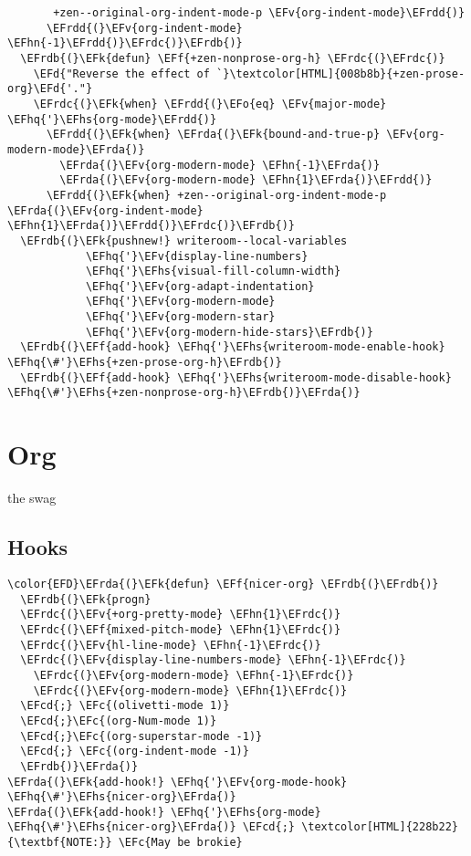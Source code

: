 \documentclass{article}
\newcommand{\EFc}[1]{\textcolor{EFc}{#1}} %
\newcommand{\EFcd}[1]{\textcolor{EFcd}{#1}} %
\newcommand{\EFd}[1]{\textcolor{EFd}{#1}} %
\newcommand{\EFk}[1]{\textcolor{EFk}{#1}} %
\newcommand{\EFf}[1]{\textcolor{EFf}{#1}} %
\newcommand{\EFv}[1]{\textcolor{EFv}{#1}} %
\newcommand{\EFo}[1]{\textcolor{EFo}{#1}} %
\newcommand{\EFhn}[1]{\textcolor{EFhn}{\textbf{#1}}} %
\newcommand{\EFhq}[1]{#1} %
\newcommand{\EFhs}[1]{\textcolor{EFhs}{#1}} %
\newcommand{\EFrda}[1]{\textcolor{EFrda}{#1}} %
\newcommand{\EFrdb}[1]{\textcolor{EFrdb}{#1}} %
\newcommand{\EFrdc}[1]{\textcolor{EFrdc}{#1}} %
\newcommand{\EFrdd}[1]{\textcolor{EFrdd}{#1}} %
\begin{document}
\begin{Code}
\begin{Verbatim}
       +zen--original-org-indent-mode-p \EFv{org-indent-mode}\EFrdd{)}
      \EFrdd{(}\EFv{org-indent-mode} \EFhn{-1}\EFrdd{)}\EFrdc{)}\EFrdb{)}
  \EFrdb{(}\EFk{defun} \EFf{+zen-nonprose-org-h} \EFrdc{(}\EFrdc{)}
    \EFd{"Reverse the effect of `}\textcolor[HTML]{008b8b}{+zen-prose-org}\EFd{'."}
    \EFrdc{(}\EFk{when} \EFrdd{(}\EFo{eq} \EFv{major-mode} \EFhq{'}\EFhs{org-mode}\EFrdd{)}
      \EFrdd{(}\EFk{when} \EFrda{(}\EFk{bound-and-true-p} \EFv{org-modern-mode}\EFrda{)}
        \EFrda{(}\EFv{org-modern-mode} \EFhn{-1}\EFrda{)}
        \EFrda{(}\EFv{org-modern-mode} \EFhn{1}\EFrda{)}\EFrdd{)}
      \EFrdd{(}\EFk{when} +zen--original-org-indent-mode-p \EFrda{(}\EFv{org-indent-mode} \EFhn{1}\EFrda{)}\EFrdd{)}\EFrdc{)}\EFrdb{)}
  \EFrdb{(}\EFk{pushnew!} writeroom--local-variables
            \EFhq{'}\EFv{display-line-numbers}
            \EFhq{'}\EFhs{visual-fill-column-width}
            \EFhq{'}\EFv{org-adapt-indentation}
            \EFhq{'}\EFv{org-modern-mode}
            \EFhq{'}\EFv{org-modern-star}
            \EFhq{'}\EFv{org-modern-hide-stars}\EFrdb{)}
  \EFrdb{(}\EFf{add-hook} \EFhq{'}\EFhs{writeroom-mode-enable-hook} \EFhq{\#'}\EFhs{+zen-prose-org-h}\EFrdb{)}
  \EFrdb{(}\EFf{add-hook} \EFhq{'}\EFhs{writeroom-mode-disable-hook} \EFhq{\#'}\EFhs{+zen-nonprose-org-h}\EFrdb{)}\EFrda{)}
\end{Verbatim}
\end{Code}

\section{Org}
\label{sec:orgfff11a4}
the swag

\subsection{Hooks}
\label{sec:org4073dbb}
\begin{Code}
\begin{Verbatim}
\color{EFD}\EFrda{(}\EFk{defun} \EFf{nicer-org} \EFrdb{(}\EFrdb{)}
  \EFrdb{(}\EFk{progn}
  \EFrdc{(}\EFv{+org-pretty-mode} \EFhn{1}\EFrdc{)}
  \EFrdc{(}\EFf{mixed-pitch-mode} \EFhn{1}\EFrdc{)}
  \EFrdc{(}\EFv{hl-line-mode} \EFhn{-1}\EFrdc{)}
  \EFrdc{(}\EFv{display-line-numbers-mode} \EFhn{-1}\EFrdc{)}
    \EFrdc{(}\EFv{org-modern-mode} \EFhn{-1}\EFrdc{)}
    \EFrdc{(}\EFv{org-modern-mode} \EFhn{1}\EFrdc{)}
  \EFcd{;} \EFc{(olivetti-mode 1)}
  \EFcd{;}\EFc{(org-Num-mode 1)}
  \EFcd{;}\EFc{(org-superstar-mode -1)}
  \EFcd{;} \EFc{(org-indent-mode -1)}
  \EFrdb{)}\EFrda{)}
\EFrda{(}\EFk{add-hook!} \EFhq{'}\EFv{org-mode-hook}  \EFhq{\#'}\EFhs{nicer-org}\EFrda{)}
\EFrda{(}\EFk{add-hook!} \EFhq{'}\EFhs{org-mode}        \EFhq{\#'}\EFhs{nicer-org}\EFrda{)} \EFcd{;} \textcolor[HTML]{228b22}{\textbf{NOTE:}} \EFc{May be brokie}
\end{Verbatim}
\end{Code}
\end{document}

